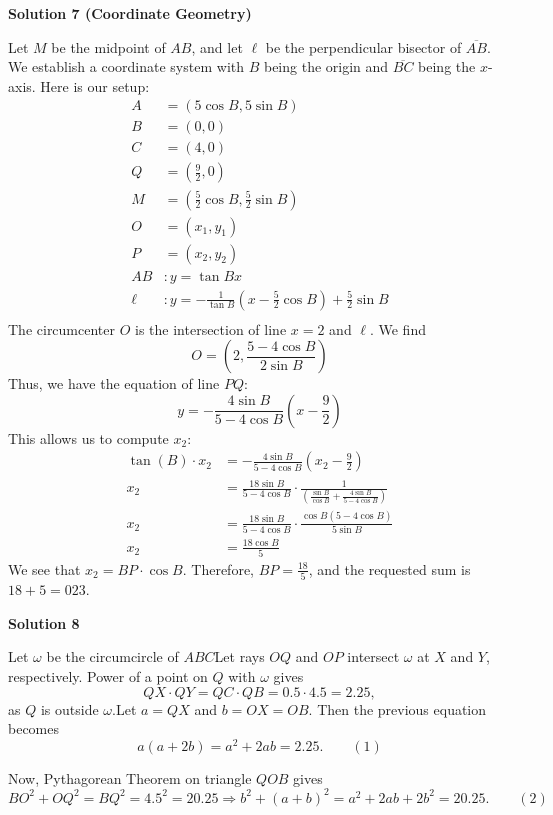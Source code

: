 \begin{enumerate}
 



\textbf{Solution 7 (Coordinate Geometry)}

Let $M$ be the midpoint of $AB$, and let $\ell$ be the perpendicular bisector of $\overline{AB}$. We establish a coordinate system with $B$ being the origin and $\overline{BC}$ being the $x$-axis. Here is our setup:\begin{align*}A&=(5\cos{B},5\sin{B})\\B&=(0,0)\\C&=(4,0)\\Q&=\left(\frac{9}{2},0\right)\\M&=\left(\frac{5}{2}\cos{B},\frac{5}{2}\sin{B}\right)\\O&=(x_{1},y_{1})\\P&=(x_{2},y_{2})\\AB&: y=\tan{B}x\\\ell&: y=-\frac{1}{\tan{B}}\left(x-\frac{5}{2}\cos{B}\right)+\frac{5}{2}\sin{B}\\\end{align*}
The circumcenter $O$ is the intersection of line $x=2$ and $\ell$. We find
 \[O=\left(2,\frac{5-4\cos{B}}{2\sin{B}}\right)\]Thus, we have the equation of line $PQ$:
 \[y=-\frac{4\sin{B}}{5-4\cos{B}}\left(x-\frac{9}{2}\right)\]This allows us to compute $x_{2}$:\begin{align*}\tan{(B)}\cdot x_{2}&=-\frac{4\sin{B}}{5-4\cos{B}}\left(x_{2}-\frac{9}{2}\right)\\x_{2}&=\frac{18\sin{B}}{5-4\cos{B}}\cdot\frac{1}{\left(\frac{\sin{B}}{\cos{B}}+\frac{4\sin{B}}{5-4\cos{B}}\right)}\\x_{2}&=\frac{18\sin{B}}{5-4\cos{B}}\cdot \frac{\cos{B}(5-4\cos{B})}{5\sin{B}}\\x_{2}&=\frac{18\cos{B}}{5}\end{align*}
We see that $x_2=BP\cdot \cos{B}$. Therefore, $BP=\frac{18}{5}$, and the requested sum is $18+5=\boxed{023}$.

 



\textbf{Solution 8}

Let $\omega$ be the circumcircle of $ABC$Let rays $OQ$ and $OP$ intersect $\omega$ at $X$ and $Y$, respectively. Power of a point on $Q$ with $\omega$ gives 
 \[QX \cdot QY = QC \cdot QB = 0.5 \cdot 4.5 = 2.25,\] as $Q$ is outside $\omega$.Let $a=QX$ and $b=OX=OB$. Then the previous equation becomes 
 \[a(a+2b)=a^2+2ab=2.25. \qquad {(1)}\]

 Now, Pythagorean Theorem on triangle $QOB$ gives 
 \[BO^2+OQ^2=BQ^2=4.5^2=20.25 \Rightarrow b^2+(a+b)^2=a^2+2ab+2b^2=20.25. \qquad{(2)}\]


\end{enumerate}
